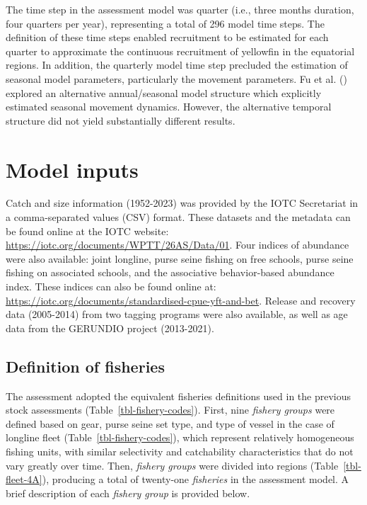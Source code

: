 \documentclass[
]{scrartcl}
\begin{document}
The time step in the assessment model was quarter (i.e., three months
duration, four quarters per year), representing a total of 296 model
time steps. The definition of these time steps enabled recruitment to be
estimated for each quarter to approximate the continuous recruitment of
yellowfin in the equatorial regions. In addition, the quarterly model
time step precluded the estimation of seasonal model parameters,
particularly the movement parameters. Fu et al.
() explored an
alternative annual/seasonal model structure which explicitly estimated
seasonal movement dynamics. However, the alternative temporal structure
did not yield substantially different results.

\section{Model inputs}\label{model-inputs}

Catch and size information (1952-2023) was provided by the IOTC
Secretariat in a comma-separated values (CSV) format. These datasets and
the metadata can be found online at the IOTC website:
\url{https://iotc.org/documents/WPTT/26AS/Data/01}. Four indices of
abundance were also available: joint longline, purse seine fishing on
free schools, purse seine fishing on associated schools, and the
associative behavior-based abundance index. These indices can also be
found online at:
\url{https://iotc.org/documents/standardised-cpue-yft-and-bet}. Release
and recovery data (2005-2014) from two tagging programs were also
available, as well as age data from the GERUNDIO project (2013-2021).

\subsection{Definition of fisheries}\label{definition-of-fisheries}

The assessment adopted the equivalent fisheries definitions used in the
previous stock assessments (Table~\ref{tbl-fishery-codes}). First, nine
\emph{fishery groups} were defined based on gear, purse seine set type,
and type of vessel in the case of longline fleet
(Table~\ref{tbl-fishery-codes}), which represent relatively homogeneous
fishing units, with similar selectivity and catchability characteristics
that do not vary greatly over time. Then, \emph{fishery groups} were
divided into regions (Table~\ref{tbl-fleet-4A}), producing a total of
twenty-one \emph{fisheries} in the assessment model. A brief description
of each \emph{fishery group} is provided below.
\end{document}
